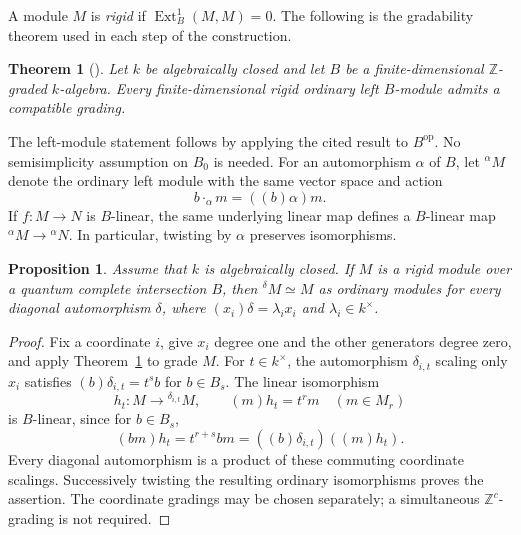 \documentclass[10pt,a4paper]{amsart}
\numberwithin{equation}{section}
\newtheorem{theorem}[definition]{Theorem}
\newtheorem{proposition}[definition]{Proposition}
\DeclareMathOperator{\Ext}{Ext}
\newcommand{\Z}{\mathbb Z}
\newcommand{\tw}[2]{{}^{#1}\!#2}
\begin{document}
A module \(M\) is \emph{rigid} if \(\Ext_B^1(M,M)=0\).
The following is the gradability theorem used in each step of the
construction.

\begin{theorem}[{\cite[Corollary 4.5]{AO13}}]\label{thm:AO}
Let \(k\) be algebraically closed and let \(B\) be a finite-dimensional
\(\Z\)-graded \(k\)-algebra. Every finite-dimensional rigid ordinary
left \(B\)-module admits a compatible grading.
\end{theorem}

The left-module statement follows by applying the cited result to
\(B^{\mathrm{op}}\). No semisimplicity assumption on \(B_0\) is needed.
For an automorphism \(\alpha\) of \(B\), let \(\tw{\alpha}{M}\) denote
the ordinary left module with the same vector space and action
\begin{equation*}
 b\cdot_\alpha m=((b)\alpha)m.
\end{equation*}
If \(f:M\to N\) is \(B\)-linear, the same underlying linear map
defines a \(B\)-linear map
\(\tw{\alpha}{M}\to\tw{\alpha}{N}\).
In particular, twisting by \(\alpha\) preserves isomorphisms.

\begin{proposition}\label{prop:diagonal}
Assume that \(k\) is algebraically closed. If \(M\) is a rigid module
over a quantum complete intersection \(B\), then
\(\tw{\delta}{M}\simeq M\) as ordinary modules for every diagonal
automorphism \(\delta\), where \((x_i)\delta=\lambda_i x_i\) and
\(\lambda_i\in k^\times\).
\end{proposition}

\begin{proof}
Fix a coordinate \(i\), give \(x_i\) degree one and the other generators
degree zero, and apply Theorem~\ref{thm:AO} to grade \(M\).
For \(t\in k^\times\), the automorphism \(\delta_{i,t}\) scaling only
\(x_i\) satisfies \((b)\delta_{i,t}=t^s b\) for \(b\in B_s\).
The linear isomorphism
\[
 h_t:M\longrightarrow\tw{\delta_{i,t}}{M},
 \qquad (m)h_t=t^r m\quad(m\in M_r)
\]
is \(B\)-linear, since for \(b\in B_s\),
\[
 (bm)h_t=t^{r+s}bm
 =((b)\delta_{i,t})((m)h_t).
\]
Every diagonal automorphism is a product of these commuting coordinate
scalings. Successively twisting the resulting ordinary isomorphisms
proves the assertion. The coordinate gradings may be chosen separately;
a simultaneous \(\Z^c\)-grading is not required.
\end{proof}
\end{document}
